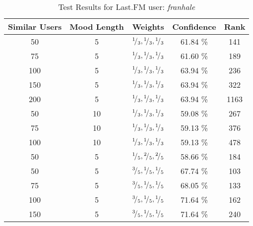 \begin{table}[h!]
\centering
\begin{tabular}{ | c | c | c || c | c | }
\hline
Similar Users	& Mood Length	& Weights							&Confidence	&Rank\\
\hline \hline
50			& 5			& \({}^{1}\!/_{3}, {}^{1}\!/_{3}, {}^{1}\!/_{3}\)	&61.84 \%		&141\\
\hline
75			& 5			& \({}^{1}\!/_{3}, {}^{1}\!/_{3}, {}^{1}\!/_{3}\)	&61.60 \%		&189\\
\hline
100			& 5			& \({}^{1}\!/_{3}, {}^{1}\!/_{3}, {}^{1}\!/_{3}\)	&63.94 \%		&236\\
\hline
150			& 5			& \({}^{1}\!/_{3}, {}^{1}\!/_{3}, {}^{1}\!/_{3}\)	&63.94 \%		&322\\
\hline
200			& 5			& \({}^{1}\!/_{3}, {}^{1}\!/_{3}, {}^{1}\!/_{3}\)	&63.94 \%		&1163\\
\hline
50			& 10			& \({}^{1}\!/_{3}, {}^{1}\!/_{3}, {}^{1}\!/_{3}\)	&59.08 \%		&267\\
\hline
75			& 10			& \({}^{1}\!/_{3}, {}^{1}\!/_{3}, {}^{1}\!/_{3}\)	&59.13 \%		&376\\
\hline
100			& 10			& \({}^{1}\!/_{3}, {}^{1}\!/_{3}, {}^{1}\!/_{3}\)	&59.13 \%		&478\\
\hline
50			& 5			& \({}^{1}\!/_{5}, {}^{2}\!/_{5}, {}^{2}\!/_{5}\)	&58.66 \%		&184\\
\hline
50			& 5			& \({}^{3}\!/_{5}, {}^{1}\!/_{5}, {}^{1}\!/_{5}\)	&67.74 \%		&103\\
\hline
75			& 5			& \({}^{3}\!/_{5}, {}^{1}\!/_{5}, {}^{1}\!/_{5}\)	&68.05 \%		&133\\
\hline
100			& 5			& \({}^{3}\!/_{5}, {}^{1}\!/_{5}, {}^{1}\!/_{5}\)	&71.64 \%		&162\\
\hline
150			& 5			& \({}^{3}\!/_{5}, {}^{1}\!/_{5}, {}^{1}\!/_{5}\)	&71.64 \%		&240\\
\hline
\end{tabular}
\caption{Test Results for Last.FM user: \emph{franhale}}
\label{table:test_results_franhale}
\end{table}

